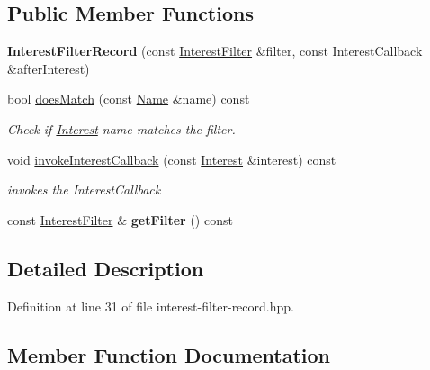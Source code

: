 \subsection*{Public Member Functions}
\begin{DoxyCompactItemize}
\item 
{\bfseries Interest\+Filter\+Record} (const \hyperlink{classndn_1_1InterestFilter}{Interest\+Filter} \&filter, const Interest\+Callback \&after\+Interest)\hypertarget{classndn_1_1InterestFilterRecord_a779a0a0b4fb55ef5bbf995ec97f156f3}{}\label{classndn_1_1InterestFilterRecord_a779a0a0b4fb55ef5bbf995ec97f156f3}

\item 
bool \hyperlink{classndn_1_1InterestFilterRecord_aa00dd1680ddb1adb1f23180df6daf162}{does\+Match} (const \hyperlink{classndn_1_1Name}{Name} \&name) const
\begin{DoxyCompactList}\small\item\em Check if \hyperlink{classndn_1_1Interest}{Interest} name matches the filter. \end{DoxyCompactList}\item 
void \hyperlink{classndn_1_1InterestFilterRecord_af73a65d6946e835539af391e13e86533}{invoke\+Interest\+Callback} (const \hyperlink{classndn_1_1Interest}{Interest} \&interest) const
\begin{DoxyCompactList}\small\item\em invokes the Interest\+Callback \end{DoxyCompactList}\item 
const \hyperlink{classndn_1_1InterestFilter}{Interest\+Filter} \& {\bfseries get\+Filter} () const\hypertarget{classndn_1_1InterestFilterRecord_a8c1740c8257e6fbb4aef3df66d694a3c}{}\label{classndn_1_1InterestFilterRecord_a8c1740c8257e6fbb4aef3df66d694a3c}

\end{DoxyCompactItemize}


\subsection{Detailed Description}


Definition at line 31 of file interest-\/filter-\/record.\+hpp.



\subsection{Member Function Documentation}
